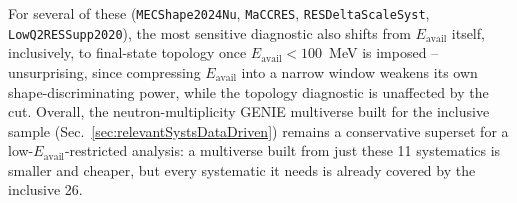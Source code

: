 For several of these (\texttt{MECShape2024Nu}, \texttt{MaCCRES},
\texttt{RESDeltaScaleSyst}, \texttt{LowQ2RESSupp2020}), the most sensitive
diagnostic also shifts from $E_{\mathrm{avail}}$ itself, inclusively, to
final-state topology once $E_{\mathrm{avail}}<100$~MeV is imposed --
unsurprising, since compressing $E_{\mathrm{avail}}$ into a narrow window
weakens its own shape-discriminating power, while the topology diagnostic
is unaffected by the cut. Overall, the neutron-multiplicity GENIE
multiverse built for the inclusive sample (Sec.~\ref{sec:relevantSystsDataDriven})
remains a conservative superset for a low-$E_{\mathrm{avail}}$-restricted
analysis: a multiverse built from just these 11 systematics is smaller and
cheaper, but every systematic it needs is already covered by the
inclusive 26.
